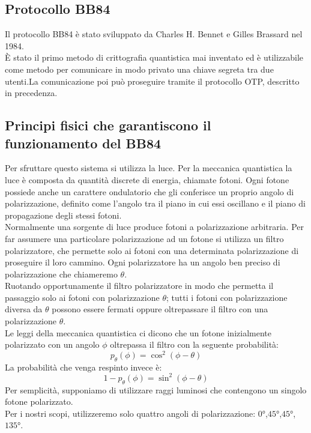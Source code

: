 \documentclass[italian,A4,12pt]{article}
\begin{document}
    \subsection{Protocollo BB84}
    Il protocollo BB84 è stato sviluppato da Charles H. Bennet e Gilles Brassard nel 1984.\\
    È stato il primo metodo di crittografia quantistica mai inventato ed è utilizzabile come metodo per comunicare in modo privato una chiave segreta tra due utenti.La comunicazione poi può proseguire tramite il protocollo OTP, descritto in precedenza.\\
    \subsection{Principi fisici che garantiscono il funzionamento del BB84}
    Per sfruttare questo sistema si utilizza la luce. Per la meccanica quantistica la luce è composta da quantità discrete di energia, chiamate fotoni. Ogni fotone possiede anche un carattere ondulatorio che gli conferisce un proprio angolo di polarizzazione, definito come l'angolo tra il piano in cui essi oscillano e il piano di propagazione degli stessi fotoni.\\
    Normalmente una sorgente di luce produce fotoni a polarizzazione arbitraria. Per far assumere una particolare polarizzazione ad un fotone si utilizza un filtro polarizzatore, che permette solo ai fotoni con una determinata polarizzazione di proseguire il loro cammino. Ogni polarizzatore ha un angolo ben preciso di polarizzazione che chiameremo $\theta$.\\
    Ruotando opportunamente il filtro polarizzatore in modo che permetta il passaggio solo ai fotoni con polarizzazione $\theta$; tutti i fotoni con polarizzazione diversa da $\theta$ possono essere fermati oppure oltrepassare il filtro con una polarizzazione $\theta$.\\
    Le leggi della meccanica quantistica ci dicono che un fotone inizialmente polarizzato con un angolo $\phi$ oltrepassa il filtro con la seguente probabilità:
    \begin{equation}
    p_{\theta}(\phi)=\cos^2(\phi-\theta) \label{prob}
    \end{equation}
    La probabilità che venga respinto invece è:
    $$1-p_{\theta}(\phi)=\sin^2(\phi-\theta)$$
    Per semplicità, supponiamo di utilizzare raggi luminosi che contengono un singolo fotone polarizzato.\\
    Per i nostri scopi, utilizzeremo solo quattro angoli di polarizzazione: $\ang{0}$,$\ang{45}$,$\ang{45}$,$\ang{135}$.\\
\end{document}
